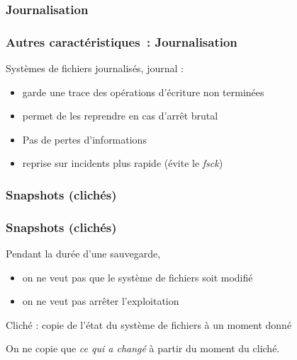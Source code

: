 \subsubsection{Journalisation}
\begin{frame}
  \frametitle{Autres caractéristiques~: Journalisation}

  \alert{Systèmes de fichiers journalisés}, \alert{journal} : 
  \begin{itemize} 
  \item garde une trace des opérations d'écriture non terminées
  \item permet de les reprendre en cas d'arrêt brutal
  \end{itemize}
  \vspace{0.5cm}

  \begin{itemize}
  \item[\ding{212}] Pas de pertes d'informations
  \item[\ding{212}] reprise sur incidents plus rapide (évite le \emph{fsck})
  \end{itemize}
\end{frame}


\subsubsection{Snapshots (clichés)}
\begin{frame}
  \frametitle{Snapshots (clichés)}

  Pendant la durée d'une sauvegarde, 
  \begin{itemize}
  \item on ne veut pas que le système de fichiers soit modifié
  \item on ne veut pas arrêter l'exploitation
  \end{itemize}

  \alert{Cliché} : copie de l'état du système de fichiers
  à un moment donné
  \vspace{0.5cm}

  On ne copie que \emph{ce qui a changé}
  à partir du moment du cliché.
\end{frame}

